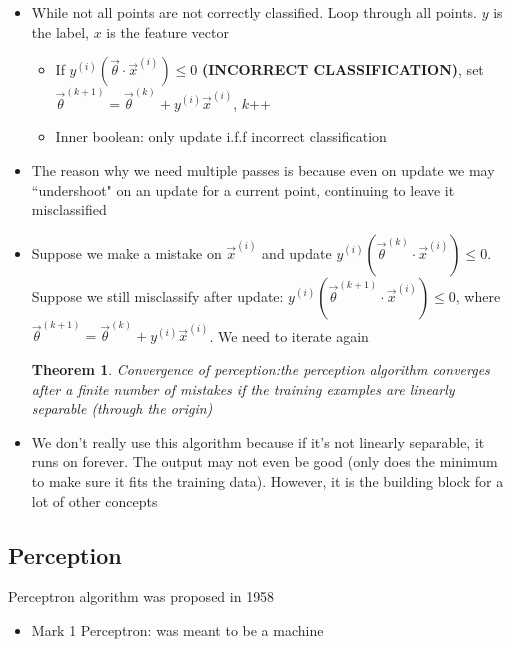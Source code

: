 \documentclass[10pt, oneside]{article}
\newtheorem{thm}{Theorem}
\begin{document}
\begin{itemize}
\begin{itemize}
\begin{itemize}
            \item While not all points are not correctly classified. Loop through all points. $y$ is the label, $x$ is the feature vector
            \begin{itemize}
                \item If $y^{(i)}(\vec \theta \cdot \vec x^{(i)})\leq 0$ \textbf{(INCORRECT CLASSIFICATION)}, set $\vec \theta^{(k+1)} =\vec \theta^{(k)} + y^{(i)} \vec x^{(i)}$, $k$++
                \item Inner boolean: only update i.f.f incorrect classification
            \end{itemize}
            \item The reason why we need multiple passes is because even on update we may ``undershoot" on an update for a current point, continuing to leave it misclassified
            \item Suppose we make a mistake on $\vec x^{(i)}$ and update $y^{(i)} (\vec \theta ^{(k)} \cdot \vec x ^{(i)})\leq 0$. Suppose we still misclassify after update: $y^{(i)} (\vec \theta ^{(k+1)} \cdot \vec x^{(i)} )\leq 0$, where $\vec \theta ^{(k+1)} = \vec \theta ^{(k)} + y^{(i)}\vec x^{(i)}$. We need to iterate again
            \begin{thm} {Convergence of perception:the perception algorithm converges after a finite number of mistakes if the training examples are linearly separable (through the origin)}\end{thm}
            \item We don't really use this algorithm because if it's not linearly separable, it runs on forever. The output may not even be good (only does the minimum to make sure it fits the training data). However, it is the building block for a lot of other concepts
        \end{itemize}
    \end{itemize}
\end{itemize}

\subsection{Perception}

Perceptron algorithm was proposed in 1958
\begin{itemize}
    \item Mark 1 Perceptron: was meant to be a machine
\end{itemize}
\end{document}
